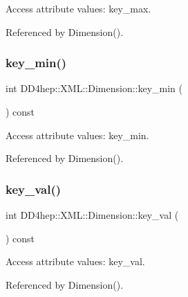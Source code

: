 Access attribute values\+: key\+\_\+max. 



Referenced by Dimension().

\hypertarget{struct_d_d4hep_1_1_x_m_l_1_1_dimension_a3d630cc257e18cb14e924032cfd9862b}{}\label{struct_d_d4hep_1_1_x_m_l_1_1_dimension_a3d630cc257e18cb14e924032cfd9862b} 
\subsubsection{\texorpdfstring{key\+\_\+min()}{key\_min()}}
{\footnotesize\ttfamily int D\+D4hep\+::\+X\+M\+L\+::\+Dimension\+::key\+\_\+min (\begin{DoxyParamCaption}{ }\end{DoxyParamCaption}) const}



Access attribute values\+: key\+\_\+min. 



Referenced by Dimension().

\hypertarget{struct_d_d4hep_1_1_x_m_l_1_1_dimension_a77287ed56013760f95872cb31f655417}{}\label{struct_d_d4hep_1_1_x_m_l_1_1_dimension_a77287ed56013760f95872cb31f655417} 
\subsubsection{\texorpdfstring{key\+\_\+val()}{key\_val()}}
{\footnotesize\ttfamily int D\+D4hep\+::\+X\+M\+L\+::\+Dimension\+::key\+\_\+val (\begin{DoxyParamCaption}{ }\end{DoxyParamCaption}) const}



Access attribute values\+: key\+\_\+val. 



Referenced by Dimension().

\hypertarget{struct_d_d4hep_1_1_x_m_l_1_1_dimension_a00113c7bbfb4a2514335c1feaf88a173}{}\label{struct_d_d4hep_1_1_x_m_l_1_1_dimension_a00113c7bbfb4a2514335c1feaf88a173} 
